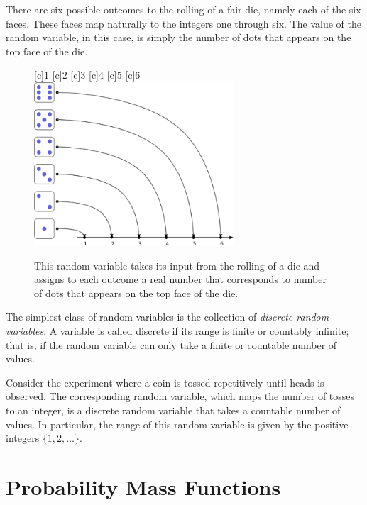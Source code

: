 \begin{example}
There are six possible outcomes to the rolling of a fair die, namely each of the six faces.
These faces map naturally to the integers one through six.
The value of the random variable, in this case, is simply the number of dots that appears on the top face of the die.

\begin{figure}[ht]
\begin{center}
\begin{psfrags}
[c]{$1$}
[c]{$2$}
[c]{$3$}
[c]{$4$}
[c]{$5$}
[c]{$6$}
\includegraphics[width=7.44cm]{Figures/5chapter/rvdices}
\caption{This random variable takes its input from the rolling of a die and assigns to each outcome a real number that corresponds to number of dots that appears on the top face of the die.}
\end{psfrags}
\end{center}
\end{figure}
\end{example}

The simplest class of random variables is the collection of \emph{discrete random variables}. 
A variable is called discrete if its range is finite or countably infinite; that is, if the random variable can only take a finite or countable number of values.

\begin{example}
Consider the experiment where a coin is tossed repetitively until heads is observed.
The corresponding random variable, which maps the number of tosses to an integer, is a discrete random variable that takes a countable number of values.
In particular, the range of this random variable is given by the positive integers $\{1, 2, \ldots \}$.
\end{example}

\section{Probability Mass Functions}

